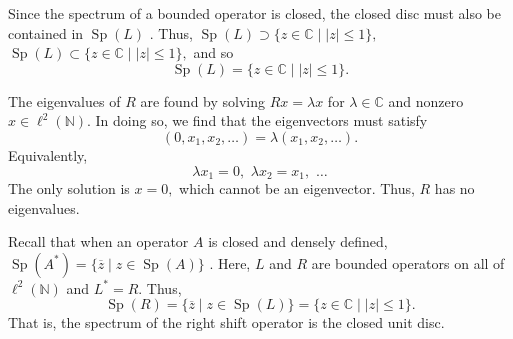 Since the spectrum of a bounded operator is closed, the closed disc must also be contained in $\operatorname{Sp}(L)$ \cite[Theorem~7.3-2]{krey}. Thus,  $ \operatorname{Sp}(L) \supset \{ z \in \mathbb{C} \mid |z| \le 1 \},$  $ \operatorname{Sp}(L) \subset \{ z \in \mathbb{C} \mid |z| \le 1 \},$ and so
 $$ \operatorname{Sp}(L) = \{ z \in \mathbb{C} \mid |z| \le 1 \}.$$


 The eigenvalues of $R$ are found by solving $Rx = \lambda x$ for $\lambda \in \mathbb{C}$ and nonzero $x \in \ell^2(\mathbb{N}).$
    In doing so, we find that the eigenvectors must satisfy
    \begin{equation}
        (0, x_1, x_2, \dots) = \lambda(x_1, x_2, \dots).
    \end{equation}
     Equivalently,
     \begin{equation}
         \lambda x_1 = 0, \,\, \lambda x_2 = x_1, \,\, \dots
     \end{equation}
   The only solution is $x=0,$ which cannot be an eigenvector. Thus, $R$ has no eigenvalues.

   Recall that when an operator $A$ is closed and densely defined, $\operatorname{Sp}(A^*) = \{\overline{z} \mid z \in \operatorname{Sp}(A) \}$ \cite[Appendix~A.3]{Matt}. Here, $L$ and $R$ are bounded operators on all of $\ell^2(\mathbb{N})$ and $L^* = R$. Thus, 
   \begin{equation}
       \operatorname{Sp}(R) = \{\overline{z} \mid z \in \operatorname{Sp}(L) \} = \{ z \in \mathbb{C} \mid |z| \le 1 \}.
   \end{equation}
   That is, the spectrum of the right shift operator is the closed unit disc.









